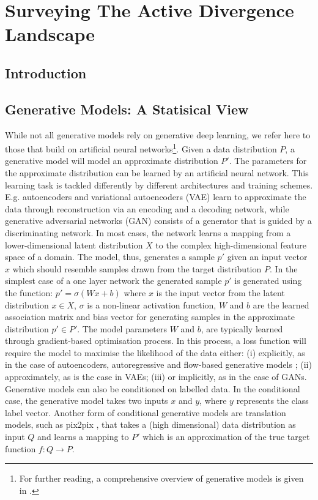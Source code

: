 \chapter{Surveying The Active Divergence Landscape}
\label{ch:active_div}

\section{Introduction}

\section{Generative Models: A Statisical View}

While not all generative models rely on generative deep learning, we refer here to those that build on artificial neural networks\footnote{
    For further reading, a comprehensive overview of generative models is given in \citet{harshvardhan2020comprehensive}.}. 
Given a data distribution $P$, a generative model will model an approximate distribution $P'$. 
The parameters for the approximate distribution can be learned by an artificial neural network. 
This learning task is tackled differently by different architectures and training schemes. 
E.g. autoencoders \citep{rumelhart1985learning} and variational autoencoders (VAE) \citep{kingma2013auto,rezende2014stochastic} learn to approximate the data through reconstruction via an encoding and a decoding network, while generative adversarial networks (GAN) \citep{goodfellow2014generative} consists of a generator that is guided by a discriminating network. 
In most cases, the network learns a mapping from a lower-dimensional latent distribution $X$ to the complex high-dimensional feature space of a domain. 
The model, thus, generates a sample $p'$ given an input vector $x$ which should resemble samples drawn from the target distribution $P$. 
In the simplest case of a one layer network the generated sample $p'$ is generated using the function: $p' = \sigma(Wx+b)$ where $x$ is the input vector from the latent distribution $x \in X$, $\sigma$ is a non-linear activation function, $W$ and $b$ are the learned association matrix and bias vector for generating samples in the approximate distribution $p' \in P'$. 
The model parameters $W$ and $b$, are typically learned through gradient-based optimisation process. 
In this process, a loss function will require the model to maximise the likelihood of the data either: (i) explicitly, as in the case of autoencoders, autoregressive \citep{frey1996does} and flow-based generative models \citep{dinh2014nice}; (ii) approximately, as is the case in VAEs; (iii) or implicitly, as in the case of GANs. Generative models can also be conditioned on labelled data. In the conditional case, the generative model takes two inputs $x$ and $y$, where $y$ represents the class label vector. 
Another form of conditional generative models are translation models, such as pix2pix \citep{isola2017image}, that takes a (high dimensional) data distribution as input $Q$ and learns a mapping to $P'$ which is an approximation of the true target function $f: Q \rightarrow P$.


